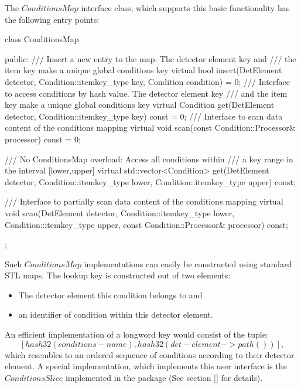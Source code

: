 \documentclass[10pt,a4paper]{article}
\begin{document}
\noindent
The $ConditionsMap$ interface class, which supports this basic functionality
has the following entry points:
\begin{unnumberedcode}
  class ConditionsMap   {
  public:
    /// Insert a new entry to the map. The detector element key and 
    /// the item key make a unique global conditions key
    virtual bool insert(DetElement         detector,
                        Condition::itemkey_type key,
                        Condition          condition) = 0;
    /// Interface to access conditions by hash value. The detector element key 
    /// and the item key make a unique global conditions key
    virtual Condition get(DetElement              detector,
                          Condition::itemkey_type key) const = 0;
    /// Interface to scan data content of the conditions mapping
    virtual void scan(const Condition::Processor& processor) const = 0;

    /// No ConditionsMap overload: Access all conditions within 
    /// a key range in the interval [lower,upper]
    virtual std::vector<Condition> get(DetElement              detector,
                                       Condition::itemkey_type lower,
                                       Condition::itemkey_type upper)  const;
      
    /// Interface to partially scan data content of the conditions mapping
    virtual void scan(DetElement                  detector,
                      Condition::itemkey_type     lower,
                      Condition::itemkey_type     upper,
                      const Condition::Processor& processor) const;
  };
\end{unnumberedcode}
Such $ConditionsMap$ implementations can easily be constructed using standard
STL maps. The lookup key is constructed out of two elements:
\begin{itemize}
\item The detector element this condition belongs to and 
\item an identifier of condition within this detector element.
\end{itemize}
An efficient implementation of a longword key would consist of the tuple:
$$
[ hash32(conditions-name) , hash32(det-element->path()) ],
$$
which resembles to an ordered sequence of conditions according to 
their detector element. A special implementation, which implements 
this user interface is the $ConditionsSlice$ implemented in the 
\DDC package (See section [] for details).

\end{document}
